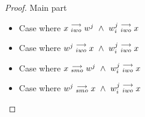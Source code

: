 \begin{proof}{Main part}
\begin{itemize}
                        \begin{itemize}
                            \item Case where $x\stackrel{\longrightarrow}{_{iwo}}w^j \ \wedge \ w_i^j\stackrel{\longrightarrow}{_{iwo}}x$
                            \item Case where $w^j\stackrel{\longrightarrow}{_{iwo}}x \ \wedge \ w_i^j\stackrel{\longrightarrow}{_{iwo}}x$
                            \item Case where $x\stackrel{\longrightarrow}{_{smo}}w^j \ \wedge \ w_i^j\stackrel{\longrightarrow}{_{iwo}}x$
                                
                                
                            \item Case where $w^j\stackrel{\longrightarrow}{_{smo}}x \ \wedge \ w_i^j\stackrel{\longrightarrow}{_{iwo}}x$




\end{itemize}
\end{itemize}
\end{proof}

